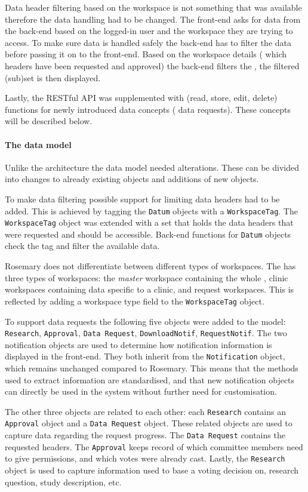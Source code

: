 Data header filtering based on the workspace is not something that was available therefore the data handling had to be changed.
The front-end asks for data from the back-end based on the logged-in user and the workspace they are trying to access.
To make sure data is handled safely the back-end has to filter the data before passing it on to the front-end.
Based on the workspace details (\ie{} which headers have been requested and approved) the back-end filters the \projectdata{}, the filtered (sub)set is then displayed.

Lastly, the RESTful API was supplemented with (read, store, edit, delete) functions for newly introduced data concepts (\eg{} data requests).
These concepts will be described below.

\paragraph{The data model}
Unlike the architecture the data model needed alterations.
These can be divided into changes to already existing objects and additions of new objects.

To make data filtering possible support for limiting data headers had to be added.
This is achieved by tagging the {\tt Datum} objects with a {\tt WorkspaceTag}.
The {\tt WorkspaceTag} object was extended with a set that holds the data headers that were requested and should be accessible.
Back-end functions for {\tt Datum} objects check the tag and filter the available data.

Rosemary does not differentiate between different types of workspaces. 
The \ivfsystem{} has three types of  workspaces: the \emph{master} workspace containing the whole \projectdata{}, clinic workspaces containing data specific to a clinic, and request workspaces.
This is reflected by adding a workspace type field to the {\tt WorkspaceTag} object.

To support data requests the following five objects were added to the model: {\tt Research}, {\tt Approval}, {\tt Data Request}, {\tt DownloadNotif}, {\tt RequestNotif}.
The two notification objects are used to determine how notification information is displayed in the front-end. 
They both inherit from the {\tt Notification} object, which remains unchanged compared to Rosemary.
This means that the methods used to extract information are standardised, and that new notification objects can directly be used in the system without further need for customisation.

The other three objects are related to each other: each {\tt Research} contains an {\tt Approval} object and a {\tt Data Request} object.
These related objects are used to capture data regarding the request progress.
The {\tt Data Request} contains the requested headers.
The {\tt Approval} keeps record of which committee members  need to give permissions, and which votes were already cast.
Lastly, the {\tt Research} object is used to capture information used to base a voting decision on, \eg{} research question, study description, etc.


